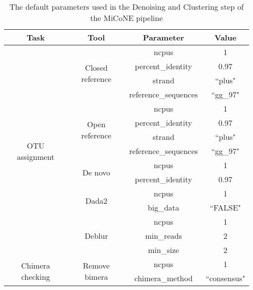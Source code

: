 \begin{table}[H]
\centering
\small
\begin{tabular}{|c|c|c|c|}
\hline
\textbf{Task}                     & \textbf{Tool}                     & \textbf{Parameter}   & \textbf{Value}       \\ \hline
\multirow{15}{*}{OTU assignment}  & \multirow{4}{*}{Closed reference} & ncpus                & 1                    \\
                                  &                                   & percent\_identity    & 0.97                 \\
                                  &                                   & strand               & ``plus"               \\
                                  &                                   & reference\_sequences & ``gg\_97" \\ \cline{2-4}
                                  & \multirow{4}{*}{Open reference}   & ncpus                & 1                    \\
                                  &                                   & percent\_identity    & 0.97                 \\
                                  &                                   & strand               & ``plus"               \\
                                  &                                   & reference\_sequences & ``gg\_97" \\ \cline{2-4}
                                  & \multirow{2}{*}{De novo}          & ncpus                & 1                    \\
                                  &                                   & percent\_identity    & 0.97                 \\ \cline{2-4}
                                  & \multirow{2}{*}{Dada2}            & ncpus                & 1                    \\
                                  &                                   & big\_data            & ``FALSE"              \\ \cline{2-4}
                                  & \multirow{3}{*}{Deblur}           & ncpus                & 1                    \\
                                  &                                   & min\_reads           & 2                    \\
                                  &                                   & min\_size            & 2                    \\ \hline
\multirow{2}{*}{Chimera checking} & \multirow{2}{*}{Remove bimera}    & ncpus                & 1                    \\
                                  &                                   & chimera\_method      & ``consensus"          \\ \hline
\end{tabular}
\caption{The default parameters used in the Denoising and Clustering step of the MiCoNE pipeline}
\label{tab:dc_parameters}
\end{table}

